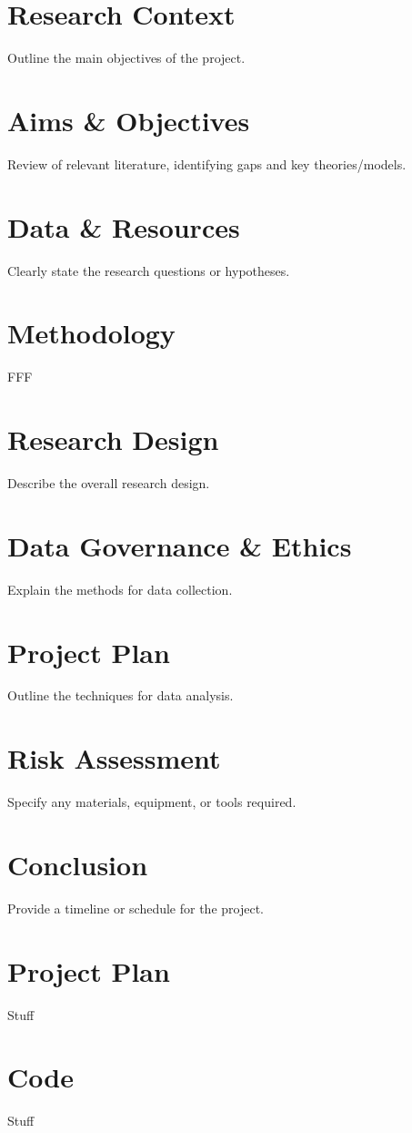 \documentclass[twocolumn]{article}
\begin{document}
\section{Research Context}
Outline the main objectives of the project.

\section{Aims \& Objectives}
Review of relevant literature, identifying gaps and key theories/models.

\section{Data \& Resources}
Clearly state the research questions or hypotheses.

\section{Methodology}
FFF
\section{Research Design}
Describe the overall research design.

\section{Data Governance \& Ethics}
Explain the methods for data collection.

\section{Project Plan}
Outline the techniques for data analysis.

\section{Risk Assessment}
Specify any materials, equipment, or tools required.

\section{Conclusion}
Provide a timeline or schedule for the project\cite{gutierrez2024}.





\begin{appendices}
\section{Project Plan}
Stuff
\section{Code}
Stuff

\end{appendices}
\end{document}
